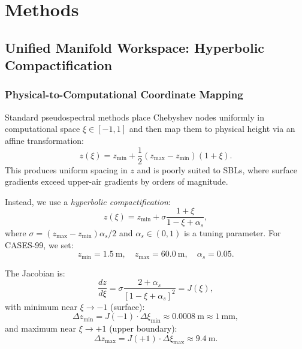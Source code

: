 \documentclass[11pt,a4paper]{article}
\begin{document}
\section{Methods}
\label{sec:methods}

\subsection{Unified Manifold Workspace: Hyperbolic Compactification}
\label{sec:methods:manifold}

\subsubsection{Physical-to-Computational Coordinate Mapping}

Standard pseudospectral methods place Chebyshev nodes uniformly in computational space $\xi \in [-1, 1]$ and then map them to physical height via an affine transformation:
\begin{equation}
z(\xi) = z_{\min} + \frac{1}{2}(z_{\max} - z_{\min})(1 + \xi).
\end{equation}
This produces uniform spacing in $z$ and is poorly suited to SBLs, where surface gradients exceed upper-air gradients by orders of magnitude.

Instead, we use a \emph{hyperbolic compactification}:
\begin{equation}
z(\xi) = z_{\min} + \sigma \frac{1 + \xi}{1 - \xi + \alpha_s},
\label{eq:hyperbolic}
\end{equation}
where $\sigma = (z_{\max} - z_{\min}) \alpha_s / 2$ and $\alpha_s \in (0, 1)$ is a tuning parameter. For CASES-99, we set:
\begin{equation}
z_{\min} = \SI{1.5}{\meter}, \quad z_{\max} = \SI{60.0}{\meter}, \quad \alpha_s = 0.05.
\end{equation}

The Jacobian is:
\begin{equation}
\frac{dz}{d\xi} = \sigma \frac{2 + \alpha_s}{[1 - \xi + \alpha_s]^2} = J(\xi),
\label{eq:jacobian}
\end{equation}
with minimum near $\xi \to -1$ (surface):
\begin{equation}
\Delta z_{\min} = J(-1) \cdot \Delta \xi_{\min} \approx \SI{0.0008}{\meter} \approx \SI{1}{\milli\meter},
\end{equation}
and maximum near $\xi \to +1$ (upper boundary):
\begin{equation}
\Delta z_{\max} = J(+1) \cdot \Delta \xi_{\max} \approx \SI{9.4}{\meter}.
\end{equation}
\end{document}
